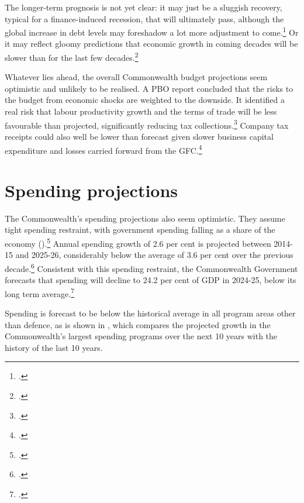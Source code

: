 The longer-term prognosis is not yet clear:  it may just be a sluggish recovery, typical for a finance-induced recession, that will ultimately pass,  although the global increase in debt levels may foreshadow a lot more adjustment to come.\footcites{BailyBosworth2013}{RoxburghLundWimmerEtAl2011} Or it may reflect gloomy predictions that economic growth in coming decades will be slower than for the last few decades.\footcite[][footnote~23]{RoxburghLundWimmerEtAl2011} 

Whatever lies ahead, the overall Commonwealth budget projections seem optimistic and unlikely to be realised. A PBO report concluded that the risks to the budget from economic shocks are weighted to the downside. It identified a real risk that labour productivity growth and the terms of trade will be less favourable than projected, significantly reducing tax collections.\footcite{PBO2014TrendsAustralianGovtReceipts1982to2013}  Company tax receipts could also well be lower than forecast given slower business capital expenditure  and losses carried forward from the GFC.\footcite[][38--44]{RBA2015a}

\section{Spending projections}
The Commonwealth’s spending projections also seem optimistic. They assume tight spending restraint, with government spending falling as a share of the economy ().\footcite[][5--11]{Treasury2015BudgetPapers201516}  Annual spending growth of 2.6 per cent is projected between 2014-15 and 2025-26, considerably below the average of 3.6 per cent over the previous decade.\footcite[][5]{PBO2015}  Consistent with this spending restraint, the Commonwealth Government forecasts that spending will decline to 24.2 per cent of GDP in 2024-25, below its long term average.\footcite[][3--9]{Treasury2015BudgetPapers201516}  

Spending is forecast to be below the historical average in all program areas other than defence, as is shown in , which compares the projected growth in the Commonwealth’s largest spending programs over the next 10 years with the history of the last 10 years. 

